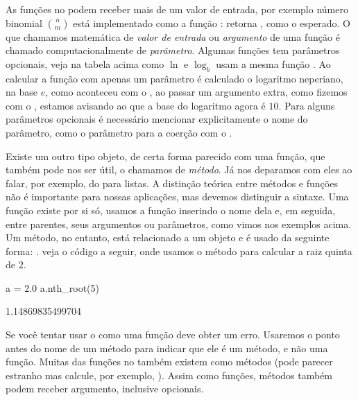 As funções no \sage podem receber mais de um valor de entrada,
por exemplo número binomial ${n\choose m}$ está implementado
como a função :  retorna
, como o esperado. O que chamamos matemática de \emph{valor de
entrada} ou \emph{argumento} de uma função é chamado computacionalmente
de \emph{parâmetro}. Algumas funções tem parâmetros
opcionais, veja na tabela acima como $\ln$ e $\log_b$ 
usam a mesma função . Ao calcular a função  com
apenas um parâmetro é calculado o logaritmo neperiano, na base
$e$, como aconteceu com o , ao passar um argumento
extra, como fizemos com o , estamos
avisando ao \sage que a base do logaritmo agora é $10$. Para
alguns parâmetros opcionais é necessário mencionar explicitamente
o nome do parâmetro, como o parâmetro  para a coerção
com o .

Existe um outro tipo objeto, de certa forma parecido com
uma função, que também pode nos ser útil, o
chamamos de \emph{método}. Já nos deparamos
com eles ao falar, por exemplo, do  para listas.
A distinção teórica entre métodos e funções não é
importante para nossas aplicações, mas devemos distinguir a
sintaxe. Uma função existe por si só, usamos a função
inserindo o nome dela e, em seguida, entre parentes, 
seus argumentos ou parâmetros, como vimos nos exemplos
acima. Um método, no entanto, está relacionado a um
objeto e é usado da seguinte forma: .
veja o código a seguir, onde usamos o método 
para calcular a raiz quinta de $2$.
\begin{sageinput}
a = 2.0
a.nth_root(5)
\end{sageinput}
\begin{sageoutput}
1.14869835499704
\end{sageoutput}
Se você tentar usar o  como uma função deve obter um erro.
Usaremos o ponto antes do nome de um método para indicar que ele é
um método, e não uma função. Muitas das funções no \sage também
existem como métodos (pode parecer estranho mas calcule, por exemplo, ).
Assim como funções, métodos também podem receber argumento, inclusive opcionais.

